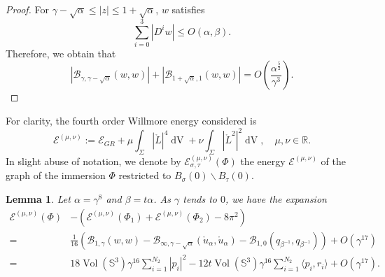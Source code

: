 \documentclass[11pt,letterpaper]{amsart}
\DeclareMathOperator{\Vol}{Vol}
\DeclareMathOperator{\dvol}{dV}
\newcommand{\mB}{\mathcal{B}}
\newcommand{\mE}{\mathcal{E}}
\newcommand{\bR}{\mathbb{R}}
\newcommand{\bS}{\mathbb{S}}
\newtheorem{lemma}[theorem]{Lemma}
\theoremstyle{definition}
\theoremstyle{remark}
\numberwithin{equation}{section}
\begin{document}
\begin{proof}
For $\gamma-\sqrt{\alpha}\leq |z|\leq 1+\sqrt{\alpha}$, $w$ satisfies
\begin{equation}\label{apriori-estimate-w}
    \sum_{i=0}^{3}|D^i w|\leq O(\alpha, \beta).
\end{equation}
Therefore, we obtain that
\begin{equation*}
    |\mB_{\gamma, \gamma-\sqrt{\alpha}}(w,w)|+|\mB_{1+\sqrt{\alpha}, 1}(w,w)|=O\left(\frac{\alpha^{\frac{5}{2}}}{\gamma^3}\right).
\end{equation*}
\end{proof}

For clarity, the fourth order Willmore energy considered is 
\begin{equation*}
   \mE^{(\mu,\nu)}:=\mE_{GR}+\mu \int_{\Sigma} |\mathring{L}|^4\dvol+\nu \int_{\Sigma}|\mathring{L}^2|^2 \dvol, \quad \mu, \nu \in \bR.
\end{equation*}
In slight abuse of notation, we denote by $ \mE^{(\mu,\nu)}_{\sigma,\tau}(\Phi)$ the energy $ \mE^{(\mu,\nu)}$ of the graph of the immersion $\Phi$ restricted to $B_{\sigma}(0)\backslash B_{\tau}(0)$.
\begin{lemma}
Let $\alpha=\gamma^8$ and $\beta=t\alpha$. As $\gamma$ tends to $0$, we have the expansion
    \begin{equation}\label{difference-of-energy}
    \begin{split}
    \mE^{(\mu,\nu)}(\Phi)&-\left(\mE^{(\mu,\nu)}(\Phi_1)+\mE^{(\mu,\nu)}(\Phi_2)-8\pi^2\right)\\
    =&\frac{1}{16}\left(\mB_{1, \gamma}(w,w)-\mB_{\infty, \gamma-\sqrt{\alpha}}(\mathring{u}_{\alpha},\mathring{u}_{\alpha})-\mB_{1, 0}(q_{\beta^{-1}},q_{\beta^{-1}})\right)+O(\gamma^{17})\\
    =&18\Vol(\bS^3) \gamma^{16}\sum_{i=1}^{N_2}|p_i|^2
            -12t\Vol(\bS^3)\gamma^{16}\sum_{i=1}^{N_2}\langle p_i, r_i\rangle + O(\gamma^{17}).
    \end{split}
\end{equation}
\end{lemma}
\end{document}
